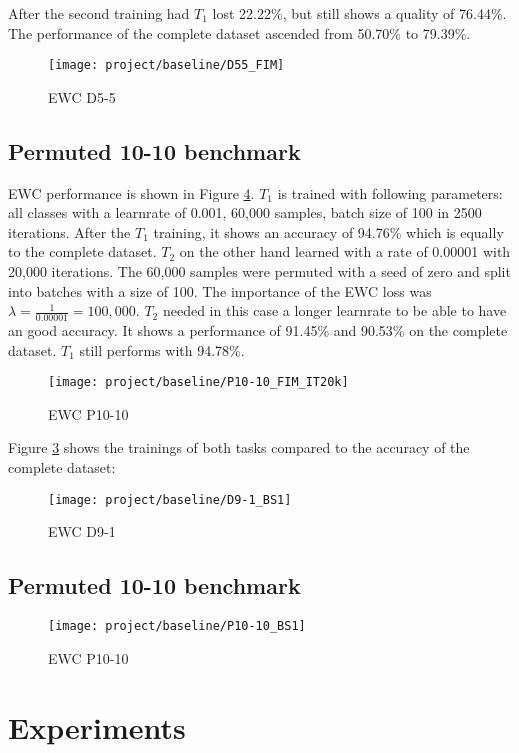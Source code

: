 After the second training had $T_1$ lost 22.22\%, but still shows a quality of 76.44\%.
The performance of the complete dataset ascended from 50.70\% to 79.39\%.

\begin{figure}[H]
    \centering
    \texttt{[image: project/baseline/D55\_FIM]}
    \caption{EWC D5-5}
    \label{fig:ewc_d5-5}
\end{figure}

\subsection*{Permuted 10-10 benchmark}

EWC performance is shown in Figure \ref{fig:ewc_p10-10}.
$T_1$ is trained with following parameters:
all classes with a
learnrate of 0.001,
60,000 samples,
batch size of 100 in
2500 iterations.
After the $T_1$ training, it shows an accuracy of 94.76\% which is equally to the complete dataset.
\newline
$T_2$ on the other hand learned with a rate of 0.00001 with 20,000 iterations.
The 60,000 samples were permuted with a seed of zero and split into batches with a size of 100.
The importance of the EWC loss was $\lambda = \frac{1}{0.00001} = 100,000$.
$T_2$ needed in this case a longer learnrate to be able to have an good accuracy.
It shows a performance of 91.45\% and 90.53\% on the complete dataset.
$T_1$ still performs with 94.78\%.

\begin{figure}[H]
    \centering
    \texttt{[image: project/baseline/P10-10\_FIM\_IT20k]}
    \caption{EWC P10-10}
    \label{fig:ewc_p10-10}
\end{figure}


Figure \ref{fig:ewc_d9-1} shows the trainings of both tasks compared to the accuracy of the complete dataset:

\begin{figure}[H]
    \centering
    \texttt{[image: project/baseline/D9-1\_BS1]}
    \caption{EWC D9-1}
    \label{fig:ewc_d9-1}
\end{figure}

\subsection*{Permuted 10-10 benchmark}



\begin{figure}[H]
    \centering
    \texttt{[image: project/baseline/P10-10\_BS1]}
    \caption{EWC P10-10}
    \label{fig:ewc_p10-10}
\end{figure}

\section{Experiments}

